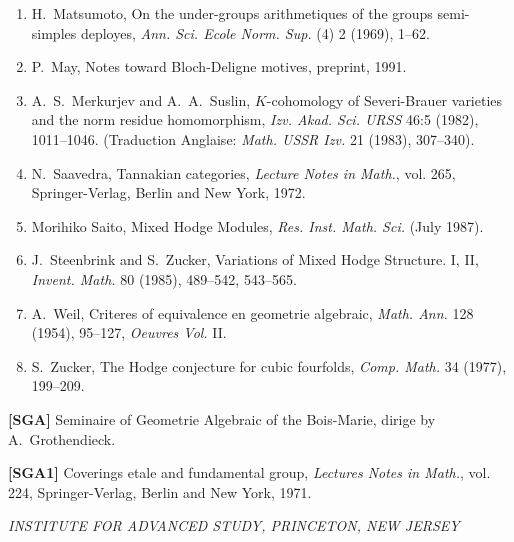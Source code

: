 \documentclass[11pt,a4paper]{article}
\theoremstyle{plain}
\theoremstyle{definition}
\begin{document}
\begin{enumerate}
\item[{[25]}] H.~Matsumoto, On the under-groups arithmetiques of the groups semi-simples deployes, \textit{Ann. Sci. Ecole Norm. Sup.} (4) 2 (1969), 1--62.

\item[{[26]}] P.~May, Notes toward Bloch-Deligne motives, preprint, 1991.

\item[{[27]}] A.~S.~Merkurjev and A.~A.~Suslin, $K$-cohomology of Severi-Brauer varieties and the norm residue homomorphism, \textit{Izv. Akad. Sci. URSS} 46:5 (1982), 1011--1046. (Traduction Anglaise: \textit{Math. USSR Izv.} 21 (1983), 307--340).

\item[{[28]}] N.~Saavedra, Tannakian categories, \textit{Lecture Notes in Math.}, vol. 265, Springer-Verlag, Berlin and New York, 1972.

\item[{[29]}] Morihiko Saito, Mixed Hodge Modules, \textit{Res. Inst. Math. Sci.} (July 1987).

\item[{[30]}] J.~Steenbrink and S.~Zucker, Variations of Mixed Hodge Structure. I, II, \textit{Invent. Math.} 80 (1985), 489--542, 543--565.

\item[{[31]}] A.~Weil, Criteres of equivalence en geometrie algebraic, \textit{Math. Ann.} 128 (1954), 95--127, \textit{Oeuvres Vol.} II.

\item[{[32]}] S.~Zucker, The Hodge conjecture for cubic fourfolds, \textit{Comp. Math.} 34 (1977), 199--209.
\end{enumerate}

\vspace{1em}
\noindent\textbf{[SGA]} Seminaire of Geometrie Algebraic of the Bois-Marie, dirige by A.~Grothendieck.

\noindent\textbf{[SGA1]} Coverings etale and fundamental group, \textit{Lectures Notes in Math.}, vol. 224, Springer-Verlag, Berlin and New York, 1971.

\vspace{2em}
\begin{flushright}
\textit{INSTITUTE FOR ADVANCED STUDY, PRINCETON, NEW JERSEY}
\end{flushright}
\end{document}
